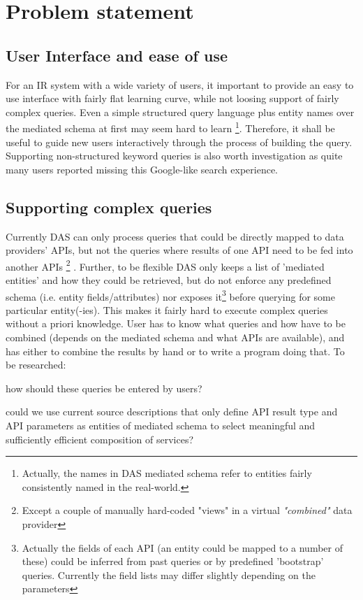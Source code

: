 
\section{Problem statement}
\subsection{User Interface and ease of use}

For an IR system with a wide variety of users, it important to provide an easy to use interface with fairly flat learning curve, while not loosing support of fairly complex queries.
%
	Even a simple structured query language plus entity names over the mediated schema  at first may seem hard to learn%
	\footnote{Actually, the names in DAS mediated schema refer to entities fairly consistently named in the real-world.}. Therefore, it shall be useful to guide new users interactively through the process of building the query.
%   
   Supporting non-structured keyword queries is also worth investigation as quite many users reported missing this Google-like search experience.
        
        
\subsection{Supporting complex queries}
Currently DAS can only process queries that could be directly mapped to data providers' APIs, but not the queries where results of one API need to be fed into another APIs 
	\footnote{Except a couple of manually hard-coded "views" in a virtual \textit{"combined"} data provider}%
. %
Further, to be flexible DAS only keeps a list of 'mediated entities' and how they could be retrieved, but do not enforce any predefined schema (i.e. entity fields/attributes) nor exposes it\footnote{%
	Actually the fields of each API  (an entity could be mapped to a number of these) could be inferred 
	from past queries or by predefined 'bootstrap' queries. Currently the field lists may differ slightly depending on the parameters}
before querying for some particular entity(-ies). 
%
This makes it fairly hard to execute complex queries  without a priori knowledge.
User has to know what queries and how have to be combined (depends on the mediated schema and what APIs are available), and has either to combine the results by hand or to write a program doing that.
%
To be researched:
	\begin{compactitem}
		\item how should these queries be entered by users?

		\item could we use current source descriptions that only define API result type and API parameters as entities of mediated schema to select meaningful and sufficiently efficient composition of services?
	\end{compactitem}
	

